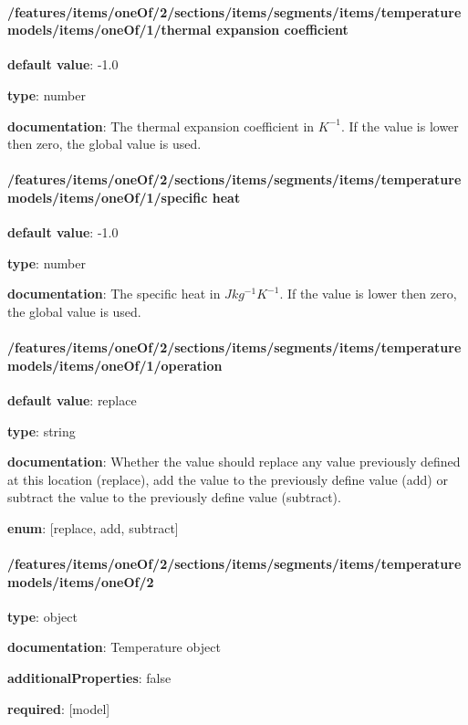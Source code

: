 \begin{itemized}
\end{itemized}\paragraph{/features/items/oneOf/2/sections/items/segments/items/temperature models/items/oneOf/1/thermal expansion coefficient} \begin{itemized}
\item {\bf default value}: -1.0
\item {\bf type}: number
\item {\bf documentation}: The thermal expansion coefficient in $K^{-1}$. If the value is lower then zero, the global value is used.
\end{itemized}\paragraph{/features/items/oneOf/2/sections/items/segments/items/temperature models/items/oneOf/1/specific heat} \begin{itemized}
\item {\bf default value}: -1.0
\item {\bf type}: number
\item {\bf documentation}: The specific heat in $J kg^{-1} K^{-1}$. If the value is lower then zero, the global value is used.
\end{itemized}\paragraph{/features/items/oneOf/2/sections/items/segments/items/temperature models/items/oneOf/1/operation} \begin{itemized}
\item {\bf default value}: replace
\item {\bf type}: string
\item {\bf documentation}: Whether the value should replace any value previously defined at this location (replace), add the value to the previously define value (add) or subtract the value to the previously define value (subtract).
\item {\bf enum}: [replace, add, subtract]\end{itemized}\paragraph{/features/items/oneOf/2/sections/items/segments/items/temperature models/items/oneOf/2} \begin{itemized}
\item {\bf type}: object
\item {\bf documentation}: Temperature object
\item {\bf additionalProperties}: false
\item {\bf required}: [model]\end{itemized}
